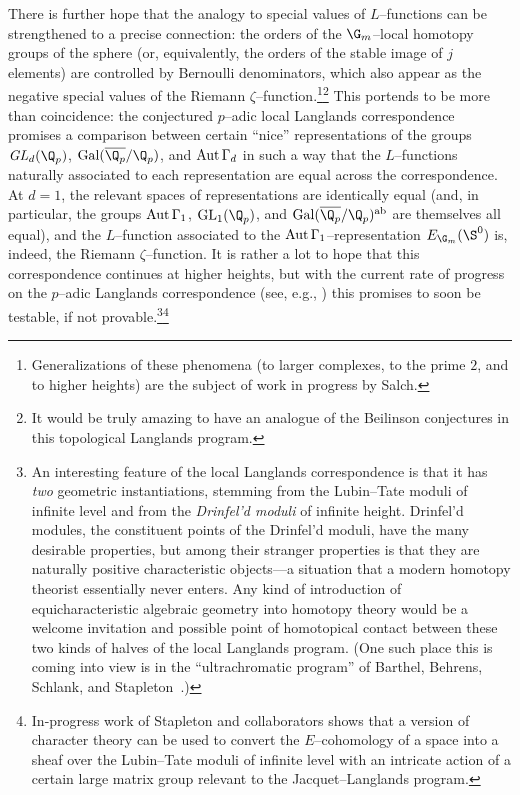 There is further hope that the analogy to special values of \(L\)--functions can be strengthened to a precise connection: the orders of the \(\G_m\)--local homotopy groups of the sphere (or, equivalently, the orders of the stable image of \(j\) elements) are controlled by Bernoulli denominators, which also appear as the negative special values of the Riemann \(\zeta\)--function.\footnote{Generalizations of these phenomena (to larger complexes, to the prime \(2\), and to higher heights) are the subject of work in progress by Salch.}\footnote{It would be truly amazing to have an analogue of the Beilinson conjectures in this topological Langlands program.}  This portends to be more than coincidence: the conjectured \(p\)--adic local Langlands correspondence promises a comparison between certain ``nice'' representations of the groups \(\mathit{GL}_d(\Q_p)\), \(\operatorname{Gal}(\overline{\Q_p} / \Q_p)\), and \(\operatorname{Aut} \Gamma_d\) in such a way that the \(L\)--functions naturally associated to each representation are equal across the correspondence.  At \(d = 1\), the relevant spaces of representations are identically equal (and, in particular, the groups \(\operatorname{Aut} \Gamma_1\), \(\mathrm{GL}_1(\Q_p)\), and \(\operatorname{Gal}(\overline{\Q_p} / \Q_p)^{\mathrm{ab}}\) are themselves all equal), and the \(L\)--function associated to the \(\operatorname{Aut} \Gamma_1\)--representation \(E_{\G_m}(\S^0)\) is, indeed, the Riemann \(\zeta\)--function.  It is rather a lot to hope that this correspondence continues at higher heights, but with the current rate of progress on the \(p\)--adic Langlands correspondence (see, e.g., \cite{KnightThesis}) this promises to soon be testable, if not provable.\footnote{An interesting feature of the local Langlands correspondence is that it has \emph{two} geometric instantiations, stemming from the Lubin--Tate moduli of infinite level and from the \emph{Drinfel'd moduli} of infinite height.  Drinfel'd modules, the constituent points of the Drinfel'd moduli, have the many desirable properties, but among their stranger properties is that they are naturally positive characteristic objects---a situation that a modern homotopy theorist essentially never enters.  Any kind of introduction of equicharacteristic algebraic geometry into homotopy theory would be a welcome invitation and possible point of homotopical contact between these two kinds of halves of the local Langlands program.  (One such place this is coming into view is in the ``ultrachromatic program'' of Barthel, Behrens, Schlank, and Stapleton~\cite{BSS}.)}\footnote{In-progress work of Stapleton and collaborators shows that a version of character theory can be used to convert the $E$--cohomology of a space into a sheaf over the Lubin--Tate moduli of infinite level with an intricate action of a certain large matrix group relevant to the Jacquet--Langlands program.}







